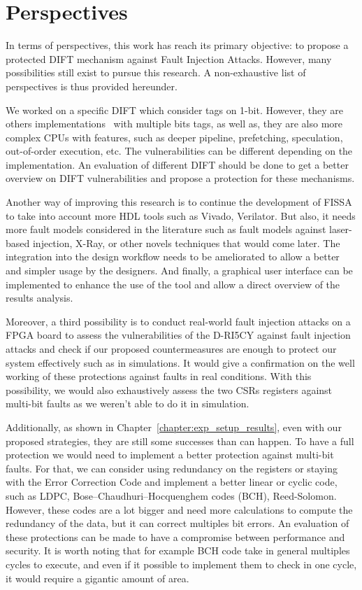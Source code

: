 \section{Perspectives}

In terms of perspectives, this work has reach its primary objective: to propose a protected DIFT mechanism against Fault Injection Attacks. However, many possibilities still exist to pursue this research. A non-exhaustive list of perspectives is thus provided hereunder.

We worked on a specific DIFT which consider tags on 1-bit. However, they are others implementations~\cite{DKK-07-sigarch} with multiple bits tags, as well as, they are also more complex CPUs with features, such as deeper pipeline, prefetching, speculation, out-of-order execution, etc. The vulnerabilities can be different depending on the implementation. An evaluation of different DIFT should be done to get a better overview on DIFT vulnerabilities and propose a protection for these mechanisms.

Another way of improving this research is to continue the development of FISSA to take into account more HDL tools such as Vivado, Verilator. But also, it needs more fault models considered in the literature such as fault models against laser-based injection, X-Ray, or other novels techniques that would come later. The integration into the design workflow needs to be ameliorated to allow a better and simpler usage by the designers. And finally, a graphical user interface can be implemented to enhance the use of the tool and allow a direct overview of the results analysis.

Moreover, a third possibility is to conduct real-world fault injection attacks on a FPGA board to assess the vulnerabilities of the D-RI5CY against fault injection attacks and check if our proposed countermeasures are enough to protect our system effectively such as in simulations. It would give a confirmation on the well working of these protections against faults in real conditions. With this possibility, we would also exhaustively assess the two CSRs registers against multi-bit faults as we weren't able to do it in simulation.

Additionally, as shown in Chapter~\ref{chapter:exp_setup_results}, even with our proposed strategies, they are still some successes than can happen. To have a full protection we would need to implement a better protection against multi-bit faults. For that, we can consider using redundancy on the registers or staying with the Error Correction Code and implement a better linear or cyclic code, such as LDPC, Bose–Chaudhuri–Hocquenghem codes (BCH), Reed-Solomon. However, these codes are a lot bigger and need more calculations to compute the redundancy of the data, but it can correct multiples bit errors. An evaluation of these protections can be made to have a compromise between performance and security. It is worth noting that for example BCH code take in general multiples cycles to execute, and even if it possible to implement them to check in one cycle, it would require a gigantic amount of area.  

